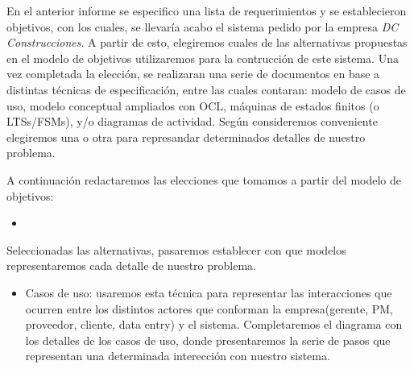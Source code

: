En el anterior informe se especifico una lista de requerimientos y se establecieron objetivos, con los cuales,
se llevaría acabo el sistema pedido por la empresa \textit{DC Construcciones}. A partir de esto,
elegiremos cuales de las alternativas propuestas en el modelo de objetivos utilizaremos para la
contrucción de este sistema. Una vez completada la elección, se realizaran una serie de documentos
en base a distintas técnicas de especificación, entre las cuales contaran: modelo de casos de uso,
modelo conceptual ampliados con OCL, máquinas de estados finitos (o LTSs/FSMs), y/o diagramas
de actividad. Según consideremos conveniente elegiremos una o otra para represandar determinados
detalles de nuestro problema.

A continuación redactaremos las elecciones que tomamos a partir del modelo de objetivos:

\begin{itemize}
\item 

\end{itemize}

Seleccionadas las alternativas, pasaremos establecer con que modelos representaremos cada detalle
 de nuestro problema.

 \begin{itemize}
  \item Casos de uso: usaremos esta técnica para representar las interacciones que ocurren entre los distintos
  actores que conforman la empresa(gerente, PM, proveedor, cliente, data entry) y el sistema. Completaremos
  el diagrama con los detalles de los casos de uso, donde presentaremos la serie de pasos que representan una
  determinada interección con nuestro sistema.
 \end{itemize}
